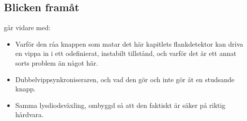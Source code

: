 \subsection*{Blicken framåt}
 går vidare med:
\begin{itemize}
  \item Varför den råa knappen som matar det här kapitlets flankdetektor kan driva en vippa in i
    ett odefinierat, instabilt tillstånd, och varför det är ett annat sorts problem än något här.
  \item Dubbelvippsynkroniseraren, och vad den gör och inte gör åt en studsande knapp.
  \item Samma lysdiodsväxling, ombyggd så att den faktiskt är säker på riktig hårdvara.
\end{itemize}
